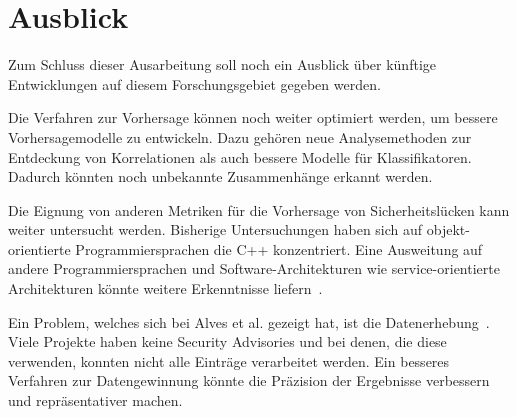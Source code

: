 \section{Ausblick}
\label{sec:ausblick}
Zum Schluss dieser Ausarbeitung soll noch ein Ausblick über künftige Entwicklungen auf diesem Forschungsgebiet gegeben werden.

Die Verfahren zur Vorhersage können noch weiter optimiert werden, um bessere Vorhersagemodelle zu entwickeln.
Dazu gehören neue Analysemethoden zur Entdeckung von Korrelationen als auch bessere Modelle für Klassifikatoren.
Dadurch könnten noch unbekannte Zusammenhänge erkannt werden.

Die Eignung von anderen Metriken für die Vorhersage von Sicherheitslücken kann weiter untersucht werden.
Bisherige Untersuchungen haben sich auf objekt-orientierte Programmiersprachen die C++ konzentriert.
Eine Ausweitung auf andere Programmiersprachen und Software-Architekturen wie service-orientierte Architekturen könnte weitere Erkenntnisse liefern~\cite{chowdhury_zulkernine_2009}.

Ein Problem, welches sich bei Alves et al. gezeigt hat, ist die Datenerhebung~\cite{alves_et_al}.
Viele Projekte haben keine Security Advisories und bei denen, die diese verwenden, konnten nicht alle Einträge verarbeitet werden.
Ein besseres Verfahren zur Datengewinnung könnte die Präzision der Ergebnisse verbessern und repräsentativer machen.
